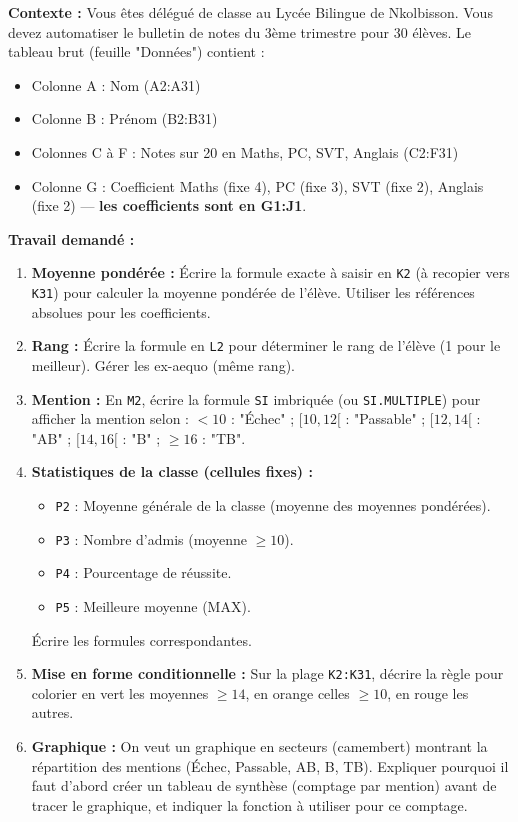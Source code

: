 \documentclass[11pt]{article}
\begin{document}
\begin{exercice}
\textbf{Contexte :} Vous êtes délégué de classe au Lycée Bilingue de Nkolbisson. Vous devez automatiser le bulletin de notes du 3ème trimestre pour 30 élèves. Le tableau brut (feuille "Données") contient :
\begin{itemize}
    \item Colonne A : Nom (A2:A31)
    \item Colonne B : Prénom (B2:B31)
    \item Colonnes C à F : Notes sur 20 en Maths, PC, SVT, Anglais (C2:F31)
    \item Colonne G : Coefficient Maths (fixe 4), PC (fixe 3), SVT (fixe 2), Anglais (fixe 2) — \textbf{les coefficients sont en G1:J1}.
\end{itemize}

\textbf{Travail demandé :}
\begin{enumerate}
    \item \textbf{Moyenne pondérée :} Écrire la formule exacte à saisir en \texttt{K2} (à recopier vers \texttt{K31}) pour calculer la moyenne pondérée de l'élève. Utiliser les références absolues pour les coefficients.
    \item \textbf{Rang :} Écrire la formule en \texttt{L2} pour déterminer le rang de l'élève (1 pour le meilleur). Gérer les ex-aequo (même rang).
    \item \textbf{Mention :} En \texttt{M2}, écrire la formule \texttt{SI} imbriquée (ou \texttt{SI.MULTIPLE}) pour afficher la mention selon : $<10$ : "Échec" ; $[10,12[$ : "Passable" ; $[12,14[$ : "AB" ; $[14,16[$ : "B" ; $\ge 16$ : "TB".
    \item \textbf{Statistiques de la classe (cellules fixes) :}
    \begin{itemize}
        \item \texttt{P2} : Moyenne générale de la classe (moyenne des moyennes pondérées).
        \item \texttt{P3} : Nombre d'admis (moyenne $\ge 10$).
        \item \texttt{P4} : Pourcentage de réussite.
        \item \texttt{P5} : Meilleure moyenne (MAX).
    \end{itemize}
    Écrire les formules correspondantes.
    \item \textbf{Mise en forme conditionnelle :} Sur la plage \texttt{K2:K31}, décrire la règle pour colorier en vert les moyennes $\ge 14$, en orange celles $\ge 10$, en rouge les autres.
    \item \textbf{Graphique :} On veut un graphique en secteurs (camembert) montrant la répartition des mentions (Échec, Passable, AB, B, TB). Expliquer pourquoi il faut d'abord créer un tableau de synthèse (comptage par mention) avant de tracer le graphique, et indiquer la fonction à utiliser pour ce comptage.
\end{enumerate}
\end{exercice}
\end{document}
